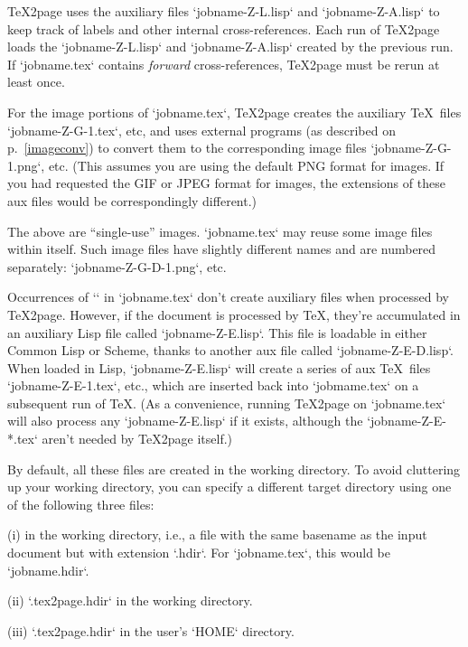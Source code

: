 {{{{{{{{{\TeX2page uses the auxiliary files `jobname-Z-L.lisp` and
`jobname-Z-A.lisp` to keep track of labels and other
internal cross-references.  Each run of \TeX2page loads
the `jobname-Z-L.lisp` and `jobname-Z-A.lisp`
created by the previous run.  If `jobname.tex` contains
{\em forward} cross-references, \TeX2page must be rerun
at least once.

For the image portions of `jobname.tex`, \TeX2page creates the auxiliary \TeX\
files `jobname-Z-G-1.tex`, etc, and uses external programs (as described on
p.~\ref{imageconv}) to convert them to the corresponding image files
`jobname-Z-G-1.png`, etc.  (This assumes you are using the default PNG format for
images.  If you had requested the GIF or JPEG format for images, the
extensions of these aux files would be correspondingly different.)

The above are “single-use” images.
`jobname.tex` may reuse some image files within itself.
Such image files have slightly different names and are
numbered separately: `jobname-Z-G-D-1.png`, etc.


Occurrences of `\eval` in `jobname.tex` don’t create auxiliary
files when processed by \TeX2page. However, if the document is
processed by \TeX, they’re accumulated in an auxiliary Lisp file
called `jobname-Z-E.lisp`. This file is loadable in either Common
Lisp or Scheme, thanks to another aux file called
`jobname-Z-E-D.lisp`. When loaded in Lisp, `jobname-Z-E.lisp`
will create a series of aux \TeX\ files `jobname-Z-E-1.tex`,
etc., which are inserted back into `jobmame.tex` on a
subsequent run of \TeX. (As a convenience, running \TeX2page on
`jobname.tex` will also process any `jobname-Z-E.lisp` if it
exists, although the `jobname-Z-E-*.tex` aren’t needed by
\TeX2page itself.)


By default, all these files are created in the working
directory.  To avoid cluttering up
your working directory, you can specify a different target directory
using one of the following three files:

(i)  in the working directory, i.e.,
a file with the same basename as the input document but with
extension `.hdir`.  For `jobname.tex`, this would
be `jobname.hdir`.

(ii) `.tex2page.hdir` in the working directory.

(iii) `.tex2page.hdir` in the user’s `HOME` directory.

}}}}}}}}}
